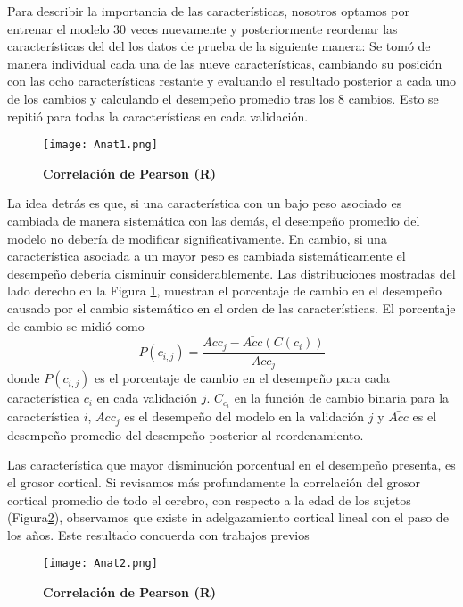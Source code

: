 \documentclass[11pt,letterpaper]{article}
\numberwithin{equation}{subsection}
\numberwithin{table}{subsection}
\begin{document}
\bigskip
\noindent Para describir la importancia de las características, nosotros optamos por entrenar el modelo 30 veces nuevamente y posteriormente reordenar las características del del los datos de prueba de la siguiente manera: Se tomó de manera individual cada una de las nueve características, cambiando su posición con las ocho características restante y evaluando el resultado posterior a cada uno de los cambios y calculando el desempeño promedio tras los 8 cambios. Esto se repitió para todas la características en cada validación. 




\begin{figure}[H]
\centering
	\texttt{[image: Anat1.png]}
	\captionsetup{labelfont=bf}
	\caption{\scriptsize \textbf {Correlación de Pearson (R)} }
	\label{fig:Fig23}
\end{figure} 

\bigskip
\noindent La idea detrás es que, si una característica con un bajo peso asociado es cambiada de manera sistemática con las demás, el desempeño promedio del modelo no debería de modificar significativamente. En cambio, si una característica asociada a un mayor peso es cambiada sistemáticamente el desempeño debería disminuir considerablemente. Las distribuciones mostradas del lado derecho en la Figura \ref{fig:Fig23}, muestran el porcentaje de cambio en el desempeño causado por el cambio sistemático en el orden de las características. El porcentaje de cambio se midió como 
\begin{equation}
P(c_{i,j})=\frac{Acc_{j}-\bar{Acc}(C(c_i))}{Acc_{j}}
\end{equation}
\noindent donde $P(c_{i,j})$ es el porcentaje de cambio en el desempeño para cada característica $c_i$ en cada validación $j$. $C_{c_i}$ en la función de cambio binaria para la característica $i$, $Acc_{j}$ es el desempeño del modelo en la validación $j$ y $\bar{Acc}$ es el desempeño promedio del desempeño posterior al reordenamiento. 

\bigskip
\noindent Las característica que mayor disminución porcentual en el desempeño presenta, es el grosor cortical. Si revisamos más profundamente la correlación del grosor cortical promedio de todo el cerebro, con respecto a la edad de los sujetos (Figura\ref{fig:Fig24}), observamos que existe in adelgazamiento cortical lineal con el paso de los años. Este resultado concuerda con trabajos previos \cite{fjell2009high}

\begin{figure}[H]
\centering
	\texttt{[image: Anat2.png]}
	\captionsetup{labelfont=bf}
	\caption{\scriptsize \textbf {Correlación de Pearson (R)} }
	\label{fig:Fig24}
\end{figure} 
\end{document}
